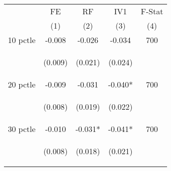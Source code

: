\begin{tabular}{lcccc}


\hline
\hline


\multicolumn{1}{l}{} & \multicolumn{1}{c}{FE} & \multicolumn{1}{c}{RF} & \multicolumn{1}{c}{IV1} & F-Stat  \\

 & (1) & (2) & (3) & (4)  \\ 
 

\hline


10 pctle   &  -0.008    &    -0.026   &     -0.034  &  700 \\

\vspace{4pt} &  \begin{footnotesize}(0.009)\end{footnotesize}   &
			    \begin{footnotesize}(0.021)\end{footnotesize}   &
			    \begin{footnotesize}(0.024)\end{footnotesize}   &
			     \\          


20 pctle   &  -0.009    &    -0.031   &     -0.040*  &  700  \\

\vspace{4pt} &  \begin{footnotesize}(0.008)\end{footnotesize}   &
			    \begin{footnotesize}(0.019)\end{footnotesize}   &
			    \begin{footnotesize}(0.022)\end{footnotesize}   &
			     \\          


30 pctle  &  -0.010    &    -0.031*   &     -0.041*  &  700  \\

\vspace{4pt} &  \begin{footnotesize}(0.008)\end{footnotesize}   &
			    \begin{footnotesize}(0.018)\end{footnotesize}   &
			    \begin{footnotesize}(0.021)\end{footnotesize}   &
			     \\          




\end{tabular}

